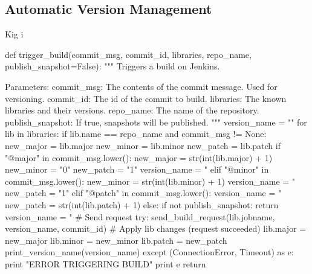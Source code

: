 \subsection{Automatic Version Management}
Kig i 
\begin{pythoncode}[caption=Part of the git hook responsible for setting library version names and triggering Jenkins,label=lst:git_hook_trigger_build]
def trigger_build(commit_msg, commit_id, libraries, repo_name, publish_snapshot=False):
    """
    Triggers a build on Jenkins.

    Parameters:
        commit_msg:       The contents of the commit message. Used for versioning.
        commit_id:        The id of the commit to build.
        libraries:        The known libraries and their versions.
        repo_name:        The name of the repository.
        publish_snapshot: If true, snapshots will be published.
    """
    version_name = ""
    for lib in libraries:
        if lib.name == repo_name and commit_msg != None:
            new_major = lib.major
            new_minor = lib.minor
            new_patch = lib.patch
            if "@major" in commit_msg.lower():
                new_major = str(int(lib.major) + 1)
                new_minor = "0"
                new_patch = "1"
                version_name = "%
            elif "@minor" in commit_msg.lower():
                new_minor = str(int(lib.minor) + 1)
                version_name = "%
                new_patch = "1"
            elif "@patch" in commit_msg.lower():
                version_name = "%
                new_patch = str(int(lib.patch) + 1)
            else:
                if not publish_snapshot:
                    return
                version_name = "%
            # Send request
            try:
                send_build_request(lib.jobname, version_name, commit_id)
                # Apply lib changes (request succeeded)
                lib.major = new_major
                lib.minor = new_minor
                lib.patch = new_patch
                print_version_name(version_name)
            except (ConnectionError, Timeout) as e:
                print "ERROR TRIGGERING BUILD"
                print e
            return
\end{pythoncode}
